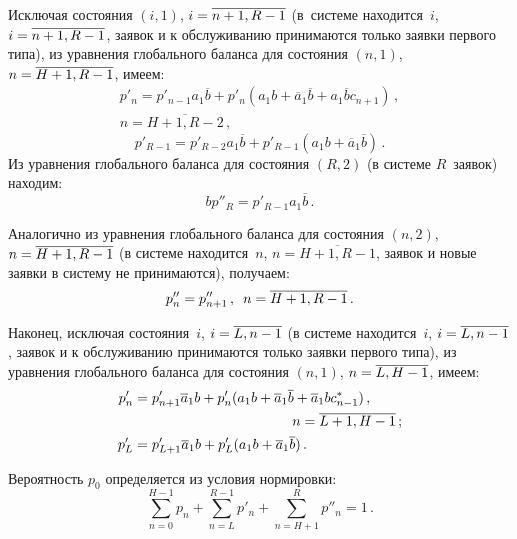 \begin{multicols}{2}
Исключая состояния $(i,1)$, $i\hm=\overline{n+1,R-1}$
(в~сис\-те\-ме находится~$i$, $i\hm=\overline{n+1,R-1}$, заявок
и к обслуживанию принимаются только заявки первого типа),
из уравнения глобального баланса для состояния
$(n,1)$, $n\hm=\overline{H+1,R-1}$, имеем:
\begin{multline}
\label{4.5}
p'_{n} = p'_{n-1} a_1 \overline{b} +
p'_{n} (a_1 b + \overline{a}_1 \overline{b} + a_1 \overline{b} c_{n+1})\,,
\\
n=\overline{H+1,R-2}\,,
\end{multline}
\begin{equation}
\label{4.6}
p'_{R-1} = p'_{R-2} a_1 \overline{b} + p'_{R-1}
(a_1 b + \overline{a}_1 \overline{b}) \,.
\end{equation}
Из уравнения глобального баланса для
состояния $(R,2)$ (в системе $R$~заявок) находим:
\begin{equation}
\label{4.7}
b p''_{R} = p'_{R-1} a_1 \overline{b} \,.
\end{equation}

Аналогично из уравнения глобального баланса для
состояния $(n,2)$, ${n\hm=\overline{H+1,R-1}}$
(в системе находится~$n$, $n=\overline{H+1,R-1}$,
заявок и новые заявки в систему не принимаются),
получаем:
\begin{equation}
\label{4.8}
p''_{n} = p''_{n+1} \,,
\enskip n=\overline{H+1,R-1}\,.
\end{equation}

Наконец, исключая состояния~$i$, $i\hm=\overline{L,n-1}$
(в системе находится~$i$, $i\hm=\overline{L,n-1}$, заявок
и к обслуживанию принимаются только заявки первого типа),
из уравнения глобального баланса для состояния
$(n,1)$, $n\hm=\overline{L,H-1}$, имеем:
\begin{align}
p'_{n} &= p'_{n+1} \overline{a}_1 b +
p'_{n} (a_1 b + \overline{a}_1 \overline{b} + \overline{a}_1 b c^*_{n-1})\,,
\notag\\
 &\hspace*{40mm}n=\overline{L+1,H-1}\,;\label{4.9}
\\
\label{4.10}
p'_{L} &= p'_{L+1} \overline{a}_1 b +
p'_{L} (a_1 b + \overline{a}_1 \overline{b})\,.
\end{align}

Вероятность $p_{0}$ определяется из условия нормировки:
\begin{equation}
\label{4.11}
\sum\limits_{n=0}^{H-1} p_{n} + \sum\limits_{n=L}^{R-1} p'_{n} +
\sum\limits_{n=H+1}^{R} p''_{n} = 1\,.
\end{equation}


\end{multicols}
